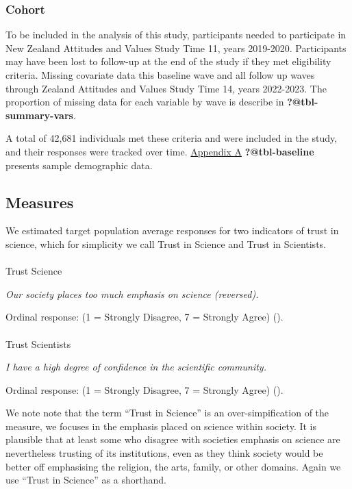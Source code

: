 \documentclass[
  single column]{article}
\makeatletter
\let\oldparagraph\paragraph
\renewcommand{\paragraph}{
    \@ifstar
      \xxxParagraphStar
      \xxxParagraphNoStar
  }
\newcommand{\xxxParagraphStar}[1]{\oldparagraph*{#1}\mbox{}}
\newcommand{\xxxParagraphNoStar}[1]{\oldparagraph{#1}\mbox{}}
\makeatother
\begin{document}
\subsubsection{Cohort}\label{cohort}

To be included in the analysis of this study, participants needed to
participate in New Zealand Attitudes and Values Study Time 11, years
2019-2020. Participants may have been lost to follow-up at the end of
the study if they met eligibility criteria. Missing covariate data this
baseline wave and all follow up waves through Zealand Attitudes and
Values Study Time 14, years 2022-2023. The proportion of missing data
for each variable by wave is describe in \textbf{?@tbl-summary-vars}.

A total of 42,681 individuals met these criteria and were included in
the study, and their responses were tracked over time.
\hyperref[appendix-a]{Appendix A} \textbf{?@tbl-baseline} presents
sample demographic data.

\subsection{Measures}\label{measures}

We estimated target population average responses for two indicators of
trust in science, which for simplicity we call Trust in Science and
Trust in Scientists.

\paragraph{Trust Science}\label{trust-science}

\emph{Our society places too much emphasis on science (reversed).}

Ordinal response: (1 = Strongly Disagree, 7 = Strongly Agree)
().

\paragraph{Trust Scientists}\label{trust-scientists}

\emph{I have a high degree of confidence in the scientific community.}

Ordinal response: (1 = Strongly Disagree, 7 = Strongly Agree)
().

We note note that the term ``Trust in Science'' is an over-simpification
of the measure, we focuses in the emphasis placed on science within
society. It is plausible that at least some who disagree with societies
emphasis on science are nevertheless trusting of its institutions, even
as they think society would be better off emphasising the religion, the
arts, family, or other domains. Again we use ``Trust in Science'' as a
shorthand.
\end{document}
